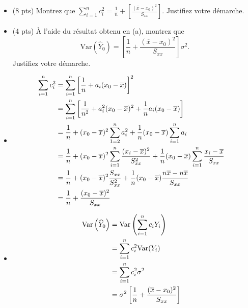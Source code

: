 \documentclass[letter, 11pt]{article}
\begin{document}
\begin{itemize}
\item[(a)] (8 pts)  Montrez que $\displaystyle \sum_{i=1}^n c_i^2 = \frac{1}{n} + \left[ \frac{(\overline{x}-x_0)^2}{S_{xx}} \right].$ Justifiez votre démarche.
\vspace{0.1 in}
\item[(b)] (4 pts) À l'aide du résultat obtenu en (a), montrez que     
$$\mathrm{Var}\left( \widehat{Y}_0 \right) = \left[ \frac{1}{n} + \frac{(\overline{x} - x_0)^2}{S_{xx}} \right] \sigma^2.$$ Justifiez votre démarche.

\end{itemize}

\begin{itemize}
    \item[(a)] 
        \begin{align*}
            \sum_{i=1}^n c_i^2 
            &= \sum_{i=1}^n \left[ \frac{1}{n} + a_i (x_0 -\overline{x}) \right]^2 \cr
            &= \sum_{i=1}^n \left[ \frac{1}{n^2} + a_i^2 (x_0 -\overline{x})^2 +  \frac{1}{n} a_i (x_0 -\overline{x}) \right]\cr
            &= \frac{1}{n} + (x_0 -\overline{x})^2 \sum_{1=2}^n a_i^2 + \frac{1}{n}  (x_0 -\overline{x}) \sum_{i=1}^n a_i \cr
            &=\frac{1}{n} + (x_0 -\overline{x})^2 \sum_{i=1}^n \frac{(x_i-\overline{x})^2}{S_{xx}^2} + \frac{1}{n}  (x_0 -\overline{x}) \sum_{i=1}^n \frac{x_i-\overline{x}}{S_{xx}} \cr
            &= \frac{1}{n} + (x_0 -\overline{x}) ^2 \frac{S_{xx}}{S_{xx}^2} + \frac{1}{n}  (x_0 -\overline{x}) \frac{n\overline{x}-n\overline{x}}{S_{xx}} \cr
            &= \frac{1}{n} +   \frac{(x_0 -\overline{x})^2}{S_{xx}}
        \end{align*}
    \item[(b)]
        \begin{align*}
            \mathrm{Var}\left( \widehat{Y}_0 \right) 
            &= \mathrm{Var} \left( \sum_{i=1}^n c_i Y_i \right) \cr
            &= \sum_{i=1}^n c_i^2 \mathrm{Var} (Y_i) \cr
            &= \sum_{i=1}^n c_i^2 \sigma^2 \cr
            &= \sigma^2  \left[ \frac{1}{n} + \frac{(\overline{x} - x_0)^2}{S_{xx}} \right] \cr
        \end{align*}
\end{itemize}
\end{document}

